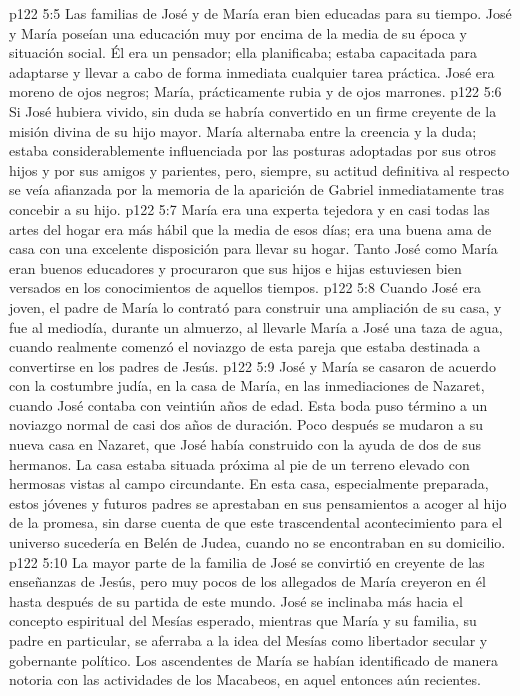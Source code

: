 \vs p122 5:5 Las familias de José y de María eran bien educadas para su tiempo. José y María poseían una educación muy por encima de la media de su época y situación social. Él era un pensador; ella planificaba; estaba capacitada para adaptarse y llevar a cabo de forma inmediata cualquier tarea práctica. José era moreno de ojos negros; María, prácticamente rubia y de ojos marrones.
\vs p122 5:6 Si José hubiera vivido, sin duda se habría convertido en un firme creyente de la misión divina de su hijo mayor. María alternaba entre la creencia y la duda; estaba considerablemente influenciada por las posturas adoptadas por sus otros hijos y por sus amigos y parientes, pero, siempre, su actitud definitiva al respecto se veía afianzada por la memoria de la aparición de Gabriel inmediatamente tras concebir a su hijo.
\vs p122 5:7 María era una experta tejedora y en casi todas las artes del hogar era más hábil que la media de esos días; era una buena ama de casa con una excelente disposición para llevar su hogar. Tanto José como María eran buenos educadores y procuraron que sus hijos e hijas estuviesen bien versados en los conocimientos de aquellos tiempos.
\vs p122 5:8 \pc Cuando José era joven, el padre de María lo contrató para construir una ampliación de su casa, y fue al mediodía, durante un almuerzo, al llevarle María a José una taza de agua, cuando realmente comenzó el noviazgo de esta pareja que estaba destinada a convertirse en los padres de Jesús.
\vs p122 5:9 José y María se casaron de acuerdo con la costumbre judía, en la casa de María, en las inmediaciones de Nazaret, cuando José contaba con veintiún años de edad. Esta boda puso término a un noviazgo normal de casi dos años de duración. Poco después se mudaron a su nueva casa en Nazaret, que José había construido con la ayuda de dos de sus hermanos. La casa estaba situada próxima al pie de un terreno elevado con hermosas vistas al campo circundante. En esta casa, especialmente preparada, estos jóvenes y futuros padres se aprestaban en sus pensamientos a acoger al hijo de la promesa, sin darse cuenta de que este trascendental acontecimiento para el universo sucedería en Belén de Judea, cuando no se encontraban en su domicilio.
\vs p122 5:10 \pc La mayor parte de la familia de José se convirtió en creyente de las enseñanzas de Jesús, pero muy pocos de los allegados de María creyeron en él hasta después de su partida de este mundo. José se inclinaba más hacia el concepto espiritual del Mesías esperado, mientras que María y su familia, su padre en particular, se aferraba a la idea del Mesías como libertador secular y gobernante político. Los ascendentes de María se habían identificado de manera notoria con las actividades de los Macabeos, en aquel entonces aún recientes.
